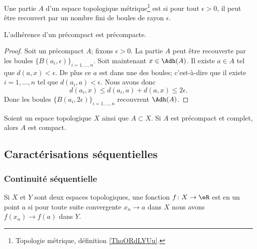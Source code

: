 \begin{definition}	\label{DEFooLZDTooZlAtdL}
	Une partie \( A\) d'un espace topologique métrique\footnote{Topologie métrique, définition \ref{ThoORdLYUu}.} est  si pour tout \( \epsilon>0\), il peut être recouvert par un nombre fini de boules de rayon \( \epsilon\).
\end{definition}

\begin{proposition}	\label{PROPooDWUDooGrgZpP}
	L'adhérence d'un précompact est précompacte.
\end{proposition}

\begin{proof}
	Soit un précompact \( A\); fixons \( \epsilon>0\). La partie \( A\) peut être recouverte par les boules \( \{ B(a_i,\epsilon) \}_{i=1,\ldots,n}\). Soit maintenant \( x\in\Adh(A)\). Il existe \( a\in A\) tel que \( d(a,x)<\epsilon\). De plus ce \( a\) est dans une des boules; c'est-à-dire que il existe \( i=1,\ldots,n\) tel que \( d(a_i,a)<\epsilon\). Nous avons donc
	\begin{equation}
		d(a_i,x)\leq d(a_i,a)+d(a,x)\leq 2\epsilon.
	\end{equation}
	Donc les boules \( \{ B(a_i,2\epsilon) \}_{i=1,\ldots,n}\) recouvrent \( \Adh(A)\).
\end{proof}

\begin{proposition}	\label{PROPooZRXDooUyFBFG}
	Soient un espace topologique \( X\) ainsi que \( A\subset X\). Si \( A\) est précompact et complet, alors \( A\) est compact.
\end{proposition}



\subsection{Caractérisations séquentielles}


\subsubsection{Continuité séquentielle}

\begin{definition}  \label{DefENioICV}
	Si \( X\) et \( Y \) sont deux espaces topologiques, une fonction \( f\colon X\to \eR\) est  en un point \( a\) si pour toute suite convergente \( x_n\to a\) dans \( X\) nous avons \( f(x_n)\to f(a)\) dans \( Y\).
\end{definition}




